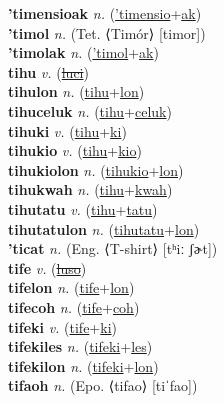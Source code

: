 \textbf{'timensioak} \textit{n.} (\hyperref['timensio]{'timensio}+\hyperref[ak]{ak})
 \label{'timensioak} \\
\textbf{'timol} \textit{n.} (Tet. ⟨Timór⟩ [timor])
 \label{'timol} \\
\textbf{'timolak} \textit{n.} (\hyperref['timol]{'timol}+\hyperref[ak]{ak})
 \label{'timolak} \\
\textbf{tihu} \textit{v.} (\hyperref[luci]{\sout{luci}})
 \label{tihu} \\
\textbf{tihulon} \textit{n.} (\hyperref[tihu]{tihu}+\hyperref[lon]{lon})
 \label{tihulon} \\
\textbf{tihuceluk} \textit{n.} (\hyperref[tihu]{tihu}+\hyperref[celuk]{celuk})
 \label{tihuceluk} \\
\textbf{tihuki} \textit{v.} (\hyperref[tihu]{tihu}+\hyperref[ki]{ki})
 \label{tihuki} \\
\textbf{tihukio} \textit{v.} (\hyperref[tihu]{tihu}+\hyperref[kio]{kio})
 \label{tihukio} \\
\textbf{tihukiolon} \textit{n.} (\hyperref[tihukio]{tihukio}+\hyperref[lon]{lon})
 \label{tihukiolon} \\
\textbf{tihukwah} \textit{n.} (\hyperref[tihu]{tihu}+\hyperref[kwah]{kwah})
 \label{tihukwah} \\
\textbf{tihutatu} \textit{v.} (\hyperref[tihu]{tihu}+\hyperref[tatu]{tatu})
 \label{tihutatu} \\
\textbf{tihutatulon} \textit{n.} (\hyperref[tihutatu]{tihutatu}+\hyperref[lon]{lon})
 \label{tihutatulon} \\
\textbf{'ticat} \textit{n.} (Eng. ⟨T-shirt⟩ [tʰiː ʃɚt])
 \label{'ticat} \\
\textbf{tife} \textit{v.} (\hyperref[luso]{\sout{luso}})
 \label{tife} \\
\textbf{tifelon} \textit{n.} (\hyperref[tife]{tife}+\hyperref[lon]{lon})
 \label{tifelon} \\
\textbf{tifecoh} \textit{n.} (\hyperref[tife]{tife}+\hyperref[coh]{coh})
 \label{tifecoh} \\
\textbf{tifeki} \textit{v.} (\hyperref[tife]{tife}+\hyperref[ki]{ki})
 \label{tifeki} \\
\textbf{tifekiles} \textit{n.} (\hyperref[tifeki]{tifeki}+\hyperref[les]{les})
 \label{tifekiles} \\
\textbf{tifekilon} \textit{n.} (\hyperref[tifeki]{tifeki}+\hyperref[lon]{lon})
 \label{tifekilon} \\
\textbf{tifaoh} \textit{n.} (Epo. ⟨tifao⟩ [tiˈfao])
 \label{tifaoh} \\

